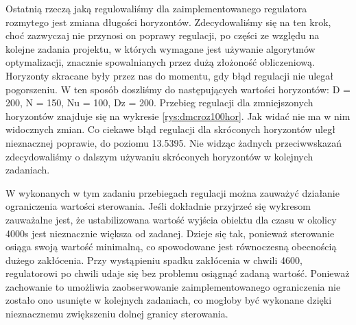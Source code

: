 		Ostatnią rzeczą jaką regulowaliśmy dla zaimplementowanego regulatora rozmytego jest zmiana długości horyzontów. Zdecydowaliśmy się na ten krok, choć zazwyczaj nie przynosi on poprawy regulacji, po części ze względu na kolejne zadania projektu, w których wymagane jest używanie algorytmów optymalizacji, znacznie spowalnianych przez dużą złożoność obliczeniową. Horyzonty skracane były przez nas do momentu, gdy błąd regulacji nie ulegał pogorszeniu. W ten sposób doszliśmy do następujących wartości horyzontów: D = 200, N = 150, Nu = 100, Dz = 200. Przebieg regulacji dla zmniejszonych horyzontów znajduje się na wykresie \ref{rys:dmcroz100hor}. Jak widać nie ma w nim widocznych zmian. Co ciekawe błąd regulacji dla skróconych horyzontów uległ nieznacznej poprawie, do poziomu 13.5395. Nie widząc żadnych przeciwwskazań zdecydowaliśmy o dalszym używaniu skróconych horyzontów w kolejnych zadaniach.
		
		W wykonanych w tym zadaniu przebiegach regulacji można zauważyć działanie ograniczenia wartości sterowania. Jeśli dokładnie przyjrzeć się wykresom zauważalne jest, że ustabilizowana wartość wyjścia obiektu dla czasu w okolicy 4000s jest nieznacznie większa od zadanej. Dzieje się tak, ponieważ sterowanie osiąga swoją wartość minimalną, co spowodowane jest równoczesną obecnością dużego zakłócenia. Przy wystąpieniu spadku zakłócenia w chwili 4600, regulatorowi po chwili udaje się bez problemu osiągnąć zadaną wartość. Ponieważ zachowanie to umożliwia zaobserwowanie zaimplementowanego ograniczenia nie zostało ono usunięte w kolejnych zadaniach, co mogłoby być wykonane dzięki nieznacznemu zwiększeniu dolnej granicy sterowania.
		
